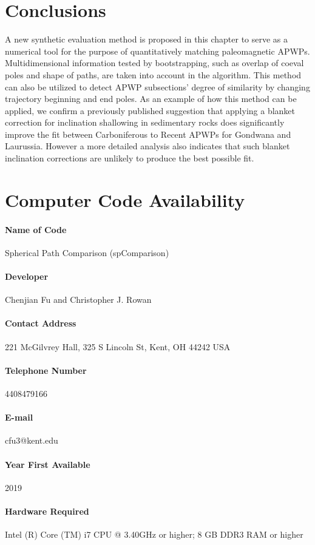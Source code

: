\section{Conclusions}
A new synthetic evaluation method is proposed in this chapter to serve as a
numerical tool for the purpose of quantitatively matching paleomagnetic APWPs.
Multidimensional information tested by bootstrapping, such as overlap of coeval
poles and shape of paths, are taken into account in the algorithm. This method
can also be utilized to detect APWP subsections' degree of similarity by
changing trajectory beginning and end poles. As an example of how this method
can be applied, we confirm a previously published suggestion that applying a
blanket correction for inclination shallowing in sedimentary rocks does
significantly improve the fit between Carboniferous to Recent APWPs for Gondwana
and Laurussia. However a more detailed analysis also indicates that such blanket
inclination corrections are unlikely to produce the best possible fit.

\section*{Computer Code Availability}
\paragraph{Name of Code} Spherical Path Comparison (spComparison)
\paragraph{Developer} Chenjian Fu and Christopher J. Rowan
\paragraph{Contact Address} 221 McGilvrey Hall, 325 S Lincoln St, Kent, OH 44242 USA
\paragraph{Telephone Number} 4408479166
\paragraph{E-mail} cfu3@kent.edu
\paragraph{Year First Available} 2019
\paragraph{Hardware Required} Intel (R) Core (TM) i7 CPU @
3.40GHz or higher; 8 GB DDR3 RAM or higher
